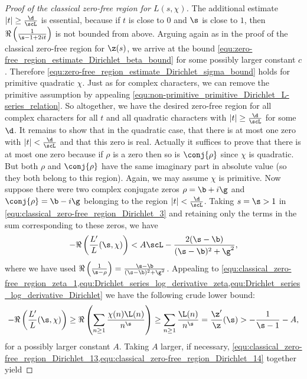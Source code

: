 \begin{proof}[Proof of the classical zero-free region for $L(s,\chi)$]
        The additional estimate $|t| \ge \frac{\d}{\scL}$ is essential, because if $t$ is close to $0$ and $\s$ is close to $1$, then $\Re\left(\frac{1}{\s-1+2it}\right)$ is not bounded from above. Arguing again as in the proof of the classical zero-free region for $\z(s)$, we arrive at the bound \cref{equ:zero-free_region_estimate_Dirichlet_beta_bound} for some possibly larger constant $c$. Therefore \cref{equ:zero-free_region_estimate_Dirichlet_sigma_bound} holds for primitive quadratic $\chi$. Just as for complex characters, we can remove the primitive assumption by appealing \cref{equ:non-primitive_primitive_Dirichlet_L-series_relation}. So altogether, we have the desired zero-free region for all complex characters for all $t$ and all quadratic characters with $|t| \ge \frac{\d}{\scL}$ for some $\d$. It remains to show that in the quadratic case, that there is at most one zero with $|t| < \frac{\d}{\scL}$ and that this zero is real. Actually it suffices to prove that there is at most one zero because if $\rho$ is a zero then so is $\conj{\rho}$ since $\chi$ is quadratic. But both $\rho$ and $\conj{\rho}$ have the same imaginary part in absolute value (so they both belong to this region). Again, we may assume $\chi$ is primitive. Now suppose there were two complex conjugate zeros $\rho = \b+i\g$ and $\conj{\rho} = \b-i\g$ belonging to the region $|t| < \frac{\d}{\scL}$. Taking $s = \s > 1$ in \cref{equ:classical_zero-free_region_Dirichlet_3} and retaining only the terms in the sum corresponding to these zeros, we have
        \begin{equation}\label{equ:classical_zero-free_region_Dirichlet_13}
          -\Re\left(\frac{L'}{L}(\s,\chi)\right) < A\scL-\frac{2(\s-\b)}{(\s-\b)^{2}+\g^{2}},
        \end{equation}
        where we have used $\Re\left(\frac{1}{\s-\rho}\right) = \frac{\s-\b}{(\s-\b)^{2}+\g^{2}}$. Appealing to \cref{equ:classical_zero-free_region_zeta_1,equ:Drichlet_series_log_derivative_zeta,equ:Drichlet_series_log_derivative_Dirichlet} we have the following crude lower bound:
        \begin{equation}\label{equ:classical_zero-free_region_Dirichlet_14}
          -\Re\left(\frac{L'}{L}(\s,\chi)\right) \ge \Re\left(\sum_{n \ge 1}\frac{\chi(n)\L(n)}{n^{\s}}\right) \ge \sum_{n \ge 1}\frac{\L(n)}{n^{\s}} = \frac{\z'}{\z}(\s) > -\frac{1}{\s-1}-A,
        \end{equation}
        for a possibly larger constant $A$. Taking $A$ larger, if necessary, \cref{equ:classical_zero-free_region_Dirichlet_13,equ:classical_zero-free_region_Dirichlet_14} together yield

\end{proof}
